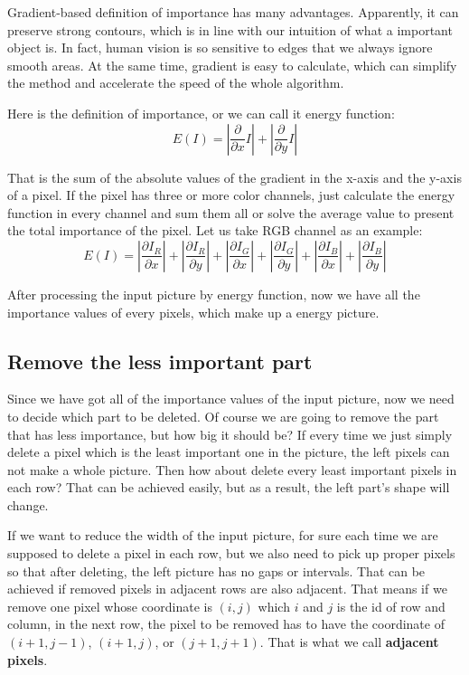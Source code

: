 \documentclass[final]{cvpr}
\begin{document}
Gradient-based definition of importance has many advantages. Apparently, it can preserve strong contours, which is in line with our intuition of what a important object is. In fact, human vision is so sensitive to edges that we always ignore smooth areas. At the same time, gradient is easy to calculate, which can simplify the method and accelerate the speed of the whole algorithm. 

Here is the definition of importance, or we can call it energy function:
$$
E(I)=|\frac{\partial}{\partial x}I|+|\frac{\partial}{\partial y}I|
$$

That is the sum of the absolute values of the gradient in the x-axis and the y-axis of a pixel. If the pixel has three or more color channels, just calculate the energy function in every channel and sum them all or solve the average value to present the total importance of the pixel. Let us take RGB channel as an example:
$$
E(I)=|\frac{\partial I_R}{\partial x}|+|\frac{\partial I_R}{\partial y}|+|\frac{\partial I_G}{\partial x}|+|\frac{\partial I_G}{\partial y}|+|\frac{\partial I_B}{\partial x}|+|\frac{\partial I_B}{\partial y}|
$$

After processing the input picture by energy function, now we have all the importance values of every pixels, which make up a energy picture.  

\subsection{Remove the less important part}
Since we have got all of the importance values of the input picture, now we need to decide which part to be deleted. Of course we are going to remove the part that has less importance, but how big it should be? If every time we just simply delete a pixel which is the least important one in the picture, the left pixels can not make a whole picture. Then how about delete every least important pixels in each row? That can be achieved easily, but as a result, the left part's shape will change. 

If we want to reduce the width of the input picture, for sure each time we are supposed to delete a pixel in each row, but we also need to pick up proper pixels  so that after deleting, the left picture has no gaps or intervals. That can be achieved if removed pixels in adjacent rows are also adjacent. That means if we remove one pixel whose coordinate is $(i,j)$ which $i$ and $j$ is the id of row and column, in the next row, the pixel to be removed has to have the coordinate of $(i+1, j-1)$, $(i+1, j)$, or $(j+1, j+1)$. That is what we call {\bf adjacent pixels}.
\end{document}
